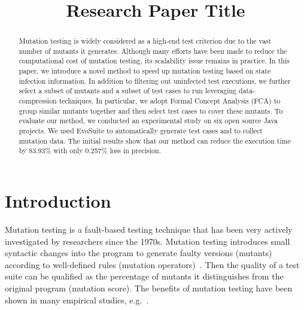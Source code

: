 \documentclass[conference]{IEEEtran} %
\begin{document}
\title{Research Paper Title}

\author{
\and
{}
}
\maketitle

\begin{abstract}

Mutation testing is widely considered as a high-end test criterion due to the vast number of mutants it generates. Although many efforts have been made to reduce the computational cost of mutation testing, its scalability issue remains in practice. In this paper, we introduce a novel method to speed up mutation testing based on state infection information. In addition to filtering out uninfected test executions, we further select a subset of mutants and a subset of test cases to run leveraging data-compression techniques. In particular, we adopt Formal Concept Analysis (FCA) to group similar mutants together and then select test cases to cover these mutants. To evaluate our method, we conducted an experimental study on six open source Java projects. We used EvoSuite to automatically generate test cases and to collect mutation data. The initial results show that our method can reduce the execution time by 83.93\% with only 0.257\% loss in precision. 

\end{abstract}

\IEEEpeerreviewmaketitle

\section{Introduction}

Mutation testing is a fault-based testing technique that has been very actively investigated by researchers since the 1970s. Mutation testing introduces small syntactic changes into the program to generate faulty versions (mutants) according to well-defined rules (mutation operators)~\cite{offutt2011mutation}. Then the quality of a test suite can be qualified as the percentage of mutants it distinguishes from the original program (mutation score). The benefits of mutation testing have been shown in many empirical studies, e.g.~\cite{mathur1994empirical, andrews2005mutation}. %
\end{document}
